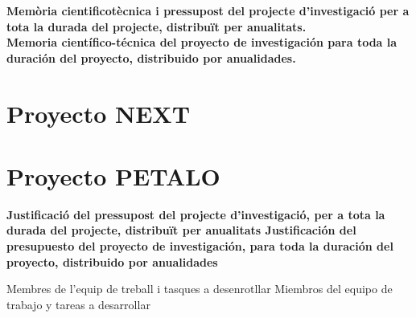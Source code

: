 \documentclass[a4paper,11pt,oneside]{article}
\begin{document}
\newpage

%
%
%
{\bf
Mem\`oria cientificot\`ecnica i pressupost del projecte d’investigació per a tota la durada del projecte, distribu\"it per anualitats. \\ Memoria cient\'ifico-t\'ecnica del proyecto de investigaci\'on para toda la duraci\'on del proyecto, distribuido por anualidades.
}


\section*{Proyecto NEXT}



\section*{Proyecto PETALO}



\newpage

{\bf
Justificació del pressupost del projecte d’investigació, per a tota la durada del projecte, distribuït per anualitats
Justificación del presupuesto del proyecto de investigación, para toda la duración del proyecto, distribuido por anualidades
}



Membres de l'equip de treball i tasques a desenrotllar 
Miembros del equipo de trabajo y tareas  a desarrollar 


\end{document}
